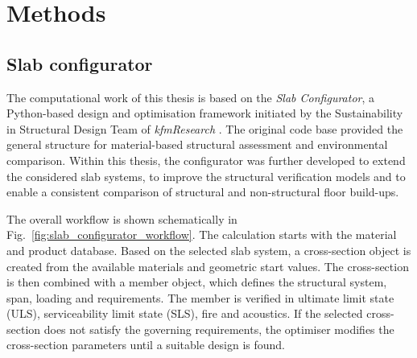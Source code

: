 \chapter{Methods}\label{sec:MM}

\section{Slab configurator}

The computational work of this thesis is based on the \textit{Slab Configurator}, a Python-based design and optimisation framework initiated by the Sustainability in Structural Design Team of \textit{kfmResearch} \cite{kfmResearch2026}. The original code base provided the general structure for material-based structural assessment and environmental comparison. Within this thesis, the configurator was further developed to extend the considered slab systems, to improve the structural verification models and to enable a consistent comparison of structural and non-structural floor build-ups.

\noindent The overall workflow is shown schematically in Fig.~\ref{fig:slab_configurator_workflow}. The calculation starts with the material and product database. Based on the selected slab system, a cross-section object is created from the available materials and geometric start values. The cross-section is then combined with a member object, which defines the structural system, span, loading and requirements. The member is verified in ultimate limit state (ULS), serviceability limit state (SLS), fire and acoustics. If the selected cross-section does not satisfy the governing requirements, the optimiser modifies the cross-section parameters until a suitable design is found.

